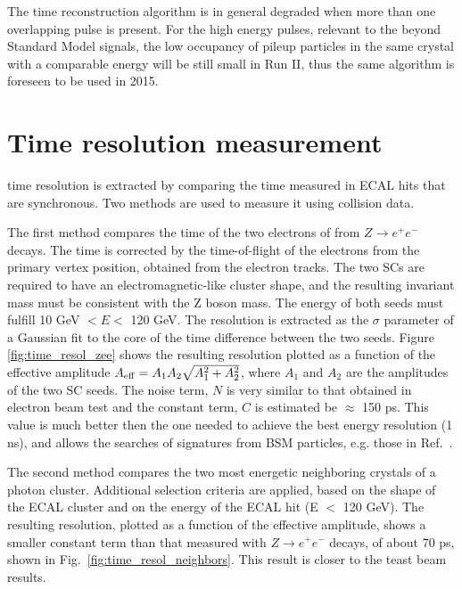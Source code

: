 \documentclass[journal]{IEEEtran}
\begin{document}
%
The time reconstruction algorithm is in general degraded when more than one overlapping pulse is present.  For the high energy pulses, relevant to the beyond Standard Model signals, the low occupancy of pileup particles in the same crystal with a comparable energy will be still small in Run II, thus the same algorithm is foreseen to be used in 2015.


\section{Time resolution measurement}
\label{sec:timeresolution}
 time resolution is extracted by comparing the time measured in ECAL hits that are synchronous. Two methods are used to measure it using collision data.

The first method compares the time of the two electrons of from $Z\to e^+e^-$ decays. The time is corrected by the time-of-flight of the electrons from the primary vertex position, obtained from the electron tracks. The two SCs are required to have an electromagnetic-like cluster shape, and the resulting invariant mass must be consistent with the Z boson mass. The energy of both seeds must fulfill 10 GeV $<E<$ 120 GeV. The resolution is extracted as the $\sigma$ parameter of a Gaussian fit to the core of the time difference between the two seeds. Figure \ref{fig:time_resol_zee} shows the resulting resolution plotted as a function of the effective amplitude $A_{\rm eff} = A_1 A_2 \sqrt{A_1^2 + A_2^2}$, where $A_1$ and $A_2$ are the amplitudes of the two SC seeds. The noise term, $N$ is very similar to that obtained in electron beam test and the constant term, $C$ is estimated be $\approx$ 150 ps. This value is much better then the one needed to achieve the best energy resolution (1 ns), and allows the searches of signatures from BSM particles, e.g. those in Ref.~\cite{Chatrchyan:2012ir}. 

The second method compares the two most energetic neighboring crystals of a photon cluster. Additional selection criteria are applied, based on the shape of the ECAL cluster and on the energy of the ECAL hit (E $<$ 120 GeV). The resulting resolution, plotted as a function of the effective amplitude, shows a smaller constant term than that measured with $Z\to e^+e^-$ decays, of about 70 ps, shown in Fig.~\ref{fig:time_resol_neighbors}. This result is closer to the teast beam results.
\end{document}
